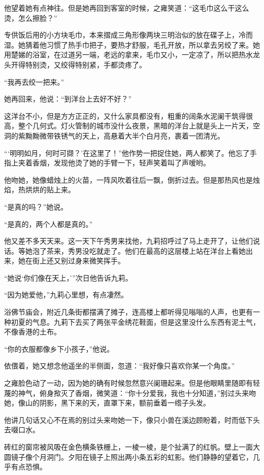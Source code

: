 \par 他望着她有点神往。但是她再回到客室的时候，之雍笑道：“这毛巾这么干这么烫，怎么擦脸？”
\par 专供饭后用的小方块毛巾，本来摺成三角形像两块三明治似的放在碟子上，冷而湿。她猜着他习惯了热手巾把子，要热才舒服，毛孔开放，所以拿去另绞了来。她用楚娣的浴室，在过道另一端，老远的拿来，毛巾又小，一定凉了，所以把热水龙头开得特别烫，又绞得特别紧，手都烫疼了。
\par “我再去绞一把来。”
\par 她再回来，他说：“到洋台上去好不好？”
\par 这洋台不小，但是方方正正的，又什么家具都没有，粗重的阔条水泥阑干筑得很高，整个几何式。灯火管制的城市没什么夜景，黑暗的洋台上就是头上一片天，空洞的紫黝黝微带铁锈气的天上，高悬着大半个白月亮，裹着一团清光。
\par “‘明明如月，何时可撷？’在这里了！”他作势一把捉住她，两人都笑了。他忘了手指上夹着香烟，发现他烫了她的手臂一下，轻声笑着叫了声嗳哟。
\par 他吻她，她像蜡烛上的火苗，一阵风吹着往后一飘，倒折过去。但是那热风也是烛焰，热烘烘的贴上来。
\par “是真的吗？”她说。
\par “是真的，两个人都是真的。”
\par 他又差不多天天来。这一天下午秀男来找他，九莉招呼过了马上走开了，让他们说话。等她泡了茶来，秀男没吃就走了。他们在最高的这层楼上站在洋台上看她出来，她在街上还又别过身来微笑挥手。
\par “她说‘你们像在天上，'”次日他告诉九莉。
\par “因为她爱他，”九莉心里想，有点凄然。
\par 浴佛节庙会，附近几条街都摆满了摊子，连高楼上都听得见嗡嗡的人声，也更有一种初夏的气息。九莉下去买了两张平金绣花鞋面，但是这里没什么东西有泥土气，不像香港的土布。
\par “你的衣服都像乡下小孩子，”他说。
\par 依偎着，她又想念他遥坐的半侧面，忽道：“我好像只喜欢你某一个角度。”
\par 之雍脸色动了一动，因为她的确有时候忽然意兴阑珊起来。但是他眼睛里随即有轻蔑的神气，俯身揿灭了香烟，微笑道：“你十分爱我，我也十分知道，”别过头来吻她，像山的阴影，黑下来的天，直罩下来，额前垂着一绺子头发。
\par 他讲几句话又心不在焉的别过头来吻她一下，像只小兽在溪边顾盼着，时而低下头去啜口水。
\par 砖红的窗帘被风吸在金色横条铁栅上，一棱一棱，是个扯满了的红帆。壁上一面大圆镜子像个月洞门。夕阳在镜子上照出两小条五彩的虹影。他们静静的望着它，几乎有点恐惧。
